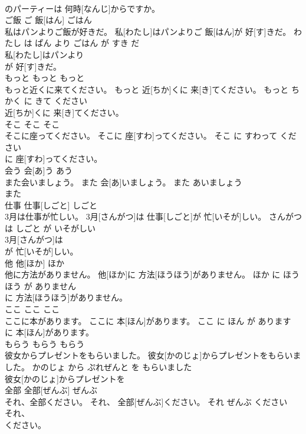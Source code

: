 \documentclass[8pt]{extreport}
\begin{document}
\begin{CJK}{UTF8}{min}
\\	のパーティーは 何時[なんじ]からですか。			
\\	ご飯	ご 飯[はん]	ごはん	
\\	私はパンよりご飯が好きだ。	私[わたし]はパンよりご 飯[はん]が 好[す]きだ。	わたし は ぱん より ごはん が すき だ	
\\	私[わたし]はパンより
\\	が 好[す]きだ。			
\\	もっと	もっと	もっと	
\\	もっと近くに来てください。	もっと 近[ちか]くに 来[き]てください。	もっと ちかく に きて ください	
\\	近[ちか]くに 来[き]てください。			
\\	そこ	そこ	そこ	
\\	そこに座ってください。	そこに 座[すわ]ってください。	そこ に すわって ください	
\\	に 座[すわ]ってください。			
\\	会う	会[あ]う	あう	
\\	また会いましょう。	また 会[あ]いましょう。	また あいましょう	
\\	また
\\	仕事	仕事[しごと]	しごと	
\\	3月は仕事が忙しい。	3月[さんがつ]は 仕事[しごと]が 忙[いそが]しい。	さんがつ は しごと が いそがしい	
\\	3月[さんがつ]は
\\	が 忙[いそが]しい。			
\\	他	他[ほか]	ほか	
\\	他に方法がありません。	他[ほか]に 方法[ほうほう]がありません。	ほか に ほうほう が ありません	
\\	に 方法[ほうほう]がありません。			
\\	ここ	ここ	ここ	
\\	ここに本があります。	ここに 本[ほん]があります。	ここ に ほん が あります	
\\	に 本[ほん]があります。			
\\	もらう	もらう	もらう	
\\	彼女からプレゼントをもらいました。	彼女[かのじょ]からプレゼントをもらいました。	かのじょ から ぷれぜんと を もらいました	
\\	彼女[かのじょ]からプレゼントを
\\	全部	全部[ぜんぶ]	ぜんぶ	
\\	それ、全部ください。	それ、 全部[ぜんぶ]ください。	それ ぜんぶ ください	
\\	それ、
\\	ください。			

\end{CJK}
\end{document}
